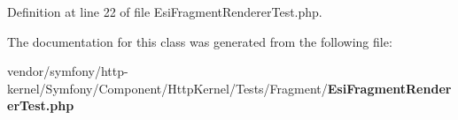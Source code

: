 Definition at line 22 of file Esi\+Fragment\+Renderer\+Test.\+php.



The documentation for this class was generated from the following file\+:\begin{DoxyCompactItemize}
\item 
vendor/symfony/http-\/kernel/\+Symfony/\+Component/\+Http\+Kernel/\+Tests/\+Fragment/{\bf Esi\+Fragment\+Renderer\+Test.\+php}\end{DoxyCompactItemize}
